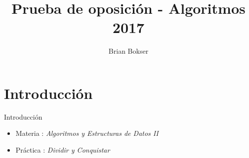 \documentclass[pdf]{beamer}
\title[Prueba de oposición] %
{Prueba de oposición - Algoritmos 2017}
\author[Brian Bokser] %
{Brian Bokser}
\institute[UBA-FCEN] %
{
  Facultad de Ciencias Exactas y Naturales\\
  Universidad de Buenos Aires
}
\begin{document}
\begin{frame}
  \titlepage
\end{frame}



\section{Introducci\'on}

\begin{frame}{Introducci\'on}
    \begin{itemize}
	\item Materia :  \emph{Algoritmos y Estructuras de Datos II}
	\vspace{2em}
	\item Práctica : \emph{Dividir y Conquistar}

    \end{itemize}

\end{frame}

    
    
\end{document}

